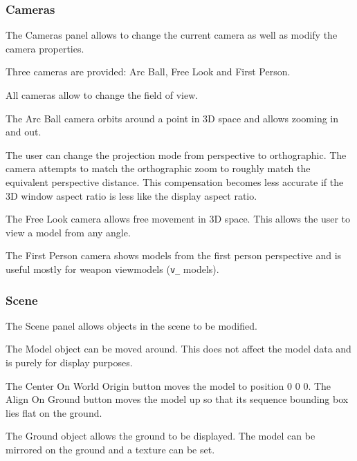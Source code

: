 \documentclass[10pt, a4paper, titlepage, oneside]{article}
\newcommand{\code}[1]{\mbox{\texttt{#1}}}
\begin{document}
\setlength{\parindent}{0cm}

\subsubsection{Cameras}

The Cameras panel allows to change the current camera as well as modify the camera properties.

\vspace{\baselineskip}
Three cameras are provided: Arc Ball, Free Look and First Person.

\vspace{\baselineskip}
All cameras allow to change the field of view.

\vspace{\baselineskip}
The Arc Ball camera orbits around a point in 3D space and allows zooming in and out.

\vspace{\baselineskip}
The user can change the projection mode from perspective to orthographic. The camera attempts to match the orthographic zoom to roughly match the equivalent perspective distance. This compensation becomes less accurate if the 3D window aspect ratio is less like the display aspect ratio.

\vspace{\baselineskip}
The Free Look camera allows free movement in 3D space. This allows the user to view a model from any angle.

\vspace{\baselineskip}
The First Person camera shows models from the first person perspective and is useful mostly for weapon viewmodels (\code{v\_} models).

\subsubsection{Scene}

The Scene panel allows objects in the scene to be modified.

\vspace{\baselineskip}
The Model object can be moved around. This does not affect the model data and is purely for display purposes.

\vspace{\baselineskip}
The Center On World Origin button moves the model to position 0 0 0.
The Align On Ground button moves the model up so that its sequence bounding box lies flat on the ground.

\vspace{\baselineskip}
The Ground object allows the ground to be displayed. The model can be mirrored on the ground and a texture can be set.
\end{document}
